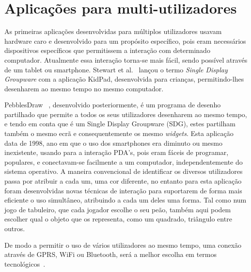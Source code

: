 \section{Aplicações para multi-utilizadores}

As primeiras aplicações desenvolvidas para múltiplos utilizadores usavam hardware caro e desenvolvido para um propósito específico, pois eram necessários dispositivos específicos que permitissem a interação com determinado computador. Atualmente essa interação torna-se mais fácil, sendo possível através de um tablet ou smartphone.
Stewart et al.~\cite{stewart1997single} lançou o termo \textit{Single Display Groupware} com a aplicação KidPad, desenvolvida para crianças, permitindo-lhes desenharem ao mesmo tempo no mesmo computador.

PebblesDraw ~\cite{Myers1998a}, desenvolvido posteriormente,  é um programa de desenho partilhado que permite a todos os seus utilizadores desenharem ao mesmo tempo, e tendo em conta que é um Single Display Groupware (SDG), estes partilham também o mesmo ecrã e consequentemente os mesmo \textit{widgets}. Esta aplicação data de 1998, ano em que o uso dos smartphones era diminuto ou mesmo inexistente, usando para a interação PDA’s, pois eram fáceis de programar, populares, e conectavam-se facilmente a um computador, independentemente do sistema operativo. 
A maneira convencional de identificar os diversos utilizadores passa por atribuir a cada um, uma cor diferente, no entanto para esta aplicação foram desenvolvidas novas técnicas de interação para suportarem de forma mais eficiente o uso simultâneo, atribuindo a cada um deles uma forma. Tal como num jogo de tabuleiro, que cada jogador escolhe o seu peão, também aqui podem escolher qual o objeto que os representa, como um quadrado, triângulo entre outros.

De modo a permitir o uso de vários utilizadores ao mesmo tempo, uma conexão através de GPRS, WiFi ou Bluetooth, será a melhor escolha em termos tecnológicos~\cite{Ballagas}.

